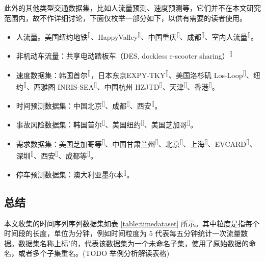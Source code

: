\documentclass{ctexart}
\renewcommand{\cite}[1]{\textsuperscript{[\citenum{#1}]}}
\begin{document}
此外的其他类型交通数据集，比如人流量预测、速度预测等，它们并不在本文研究范围内，故不作详细讨论，下面仅枚举一部分如下，以供有需要的读者使用。
\begin{itemize}
    \item 人流量。美国纽约地铁\cite{T-290}、HappyValley\cite{T-205}、中国重庆\cite{T-220}、成都\cite{T-274}、室内人流量\cite{T-272}。
    \item 非机动车流量：共享电动踏板车（DES, dockless e-scooter sharing）\cite{T-286}
    \item 速度数据集：韩国首尔\cite{T-73, T-236}，日本东京EXPY-TKY\cite{T-136}、美国洛杉矶 Los-Loop\cite{T-218}、纽约\cite{T-109, T-92}、西雅图 INRIS-SEA\cite{T-79}、中国杭州 HZJTD\cite{T-69, T-334, T-244}、天津\cite{T-190}、香港\cite{T-221}。
    \item 时间预测数据集：中国北京\cite{T-322}、成都\cite{T-322}、西安\cite{T-322}。
    \item 事故风险数据集：韩国首尔\cite{T-332}、美国纽约\cite{T-289}、美国芝加哥\cite{T-289}。
    \item 需求数据集：美国芝加哥等\cite{T-278, T-255}、中国甘肃兰州\cite{T-226}、北京\cite{T-234}、上海\cite{T-234}、EVCARD\cite{T-70}、深圳\cite{T-268}、西安\cite{T-268}、成都等\cite{T-268}。
    \item 停车预测数据集：澳大利亚墨尔本\cite{T-273}。
\end{itemize}

\subsection{总结}
本文收集的时间序列序列数据集如表 \ref{table:timedataset} 所示。其中粒度是指每个时间段的长度，单位为分钟，例如时间粒度为 $5$ 代表每五分钟统计一次流量数据。数据集名称上标'的，代表该数据集为一个未命名子集，使用了原始数据的命名，或者多个子集重名。(TODO 举例分析解读表格)
\end{document}
